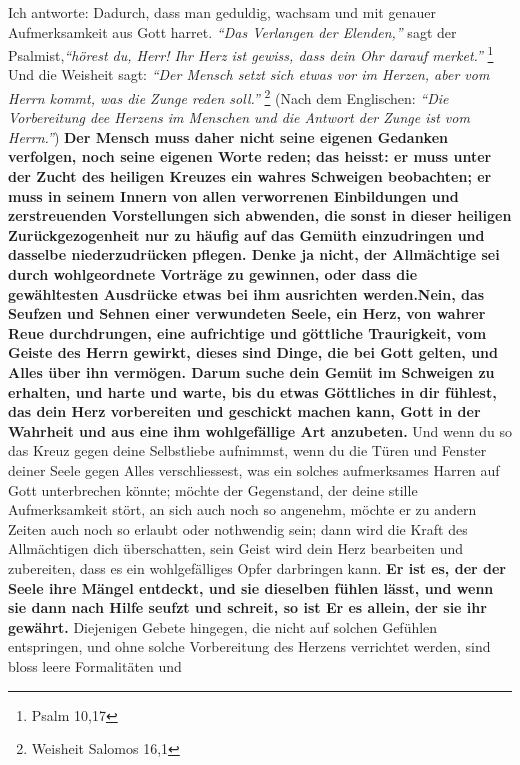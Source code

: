  Ich antworte: Dadurch, dass man geduldig,
wachsam und mit genauer Aufmerksamkeit
aus Gott harret.
\textit{"`Das Verlangen der Elenden,"'} sagt der Psalmist,\textit{"`hörest du,
Herr! Ihr Herz ist gewiss, dass dein Ohr darauf merket."'}
\footnote{Psalm 10,17}
Und die Weisheit sagt:
\textit{"`Der Mensch setzt sich etwas vor im Herzen, aber vom
Herrn kommt, was die Zunge reden soll."'}
\footnote{Weisheit Salomos 16,1}
(Nach dem
Englischen:
\textit{"`Die Vorbereitung dee Herzens im Menschen und die Antwort der Zunge
ist vom Herrn."'})  \textbf{Der Mensch muss
daher nicht seine eigenen Gedanken verfolgen,
noch seine eigenen Worte reden; das heisst: er muss unter der Zucht des heiligen
Kreuzes ein wahres Schweigen beobachten; er muss in seinem Innern von allen
verworrenen Einbildungen und zerstreuenden Vorstellungen sich abwenden, die
sonst in dieser heiligen Zurückgezogenheit nur zu häufig auf das Gemüth
einzudringen und dasselbe niederzudrücken pflegen. Denke ja nicht, der
Allmächtige sei durch wohlgeordnete Vorträge zu gewinnen, oder dass die
gewähltesten Ausdrücke etwas bei ihm ausrichten werden.Nein, das Seufzen und
Sehnen einer verwundeten Seele, ein Herz, von wahrer Reue durchdrungen, eine
aufrichtige und göttliche Traurigkeit, vom Geiste des Herrn gewirkt, dieses sind
Dinge, die bei Gott gelten, und Alles über ihn vermögen. Darum suche dein Gemüt
im Schweigen zu erhalten, und harte und warte, bis du etwas Göttliches in dir
fühlest, das dein Herz vorbereiten und geschickt machen kann, Gott in der
Wahrheit und aus eine ihm wohlgefällige Art anzubeten.} 
Und wenn du so das Kreuz
gegen deine Selbstliebe aufnimmst, wenn du die Türen und Fenster deiner Seele
gegen Alles verschliessest, was ein solches aufmerksames Harren auf Gott
unterbrechen könnte; möchte der Gegenstand, der deine stille Aufmerksamkeit
stört, an sich auch noch so angenehm, möchte er zu andern Zeiten auch noch so
erlaubt oder nothwendig sein; dann wird die Kraft des Allmächtigen dich
überschatten, sein Geist wird dein Herz bearbeiten und zubereiten, dass es ein
wohlgefälliges Opfer darbringen kann. \textbf{Er ist es, der der Seele ihre
Mängel
entdeckt, und sie dieselben fühlen lässt, und wenn sie dann nach Hilfe seufzt
und schreit, so ist Er es allein, der sie ihr gewährt.} 
Diejenigen Gebete
hingegen, die nicht auf solchen Gefühlen entspringen, und ohne solche
Vorbereitung des Herzens verrichtet werden, sind bloss leere Formalitäten und
